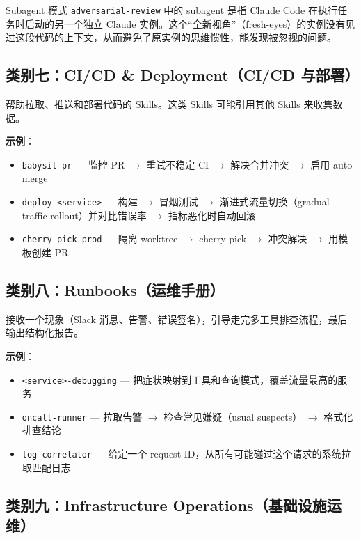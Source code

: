 \begin{knowledgebox}{Subagent 模式}
\texttt{adversarial-review} 中的 subagent 是指 Claude Code 在执行任务时启动的另一个独立 Claude 实例。这个``全新视角''（fresh-eyes）的实例没有见过这段代码的上下文，从而避免了原实例的思维惯性，能发现被忽视的问题。
\end{knowledgebox}

\subsection{类别七：CI/CD \& Deployment（CI/CD 与部署）}

帮助拉取、推送和部署代码的 Skills。这类 Skills 可能引用其他 Skills 来收集数据。

\textbf{示例}：
\begin{itemize}
    \item \texttt{babysit-pr} --- 监控 PR $\to$ 重试不稳定 CI $\to$ 解决合并冲突 $\to$ 启用 auto-merge
    \item \texttt{deploy-<service>} --- 构建 $\to$ 冒烟测试 $\to$ 渐进式流量切换（gradual traffic rollout）并对比错误率 $\to$ 指标恶化时自动回滚
    \item \texttt{cherry-pick-prod} --- 隔离 worktree $\to$ cherry-pick $\to$ 冲突解决 $\to$ 用模板创建 PR
\end{itemize}

\subsection{类别八：Runbooks（运维手册）}

接收一个现象（Slack 消息、告警、错误签名），引导走完多工具排查流程，最后输出结构化报告。

\textbf{示例}：
\begin{itemize}
    \item \texttt{<service>-debugging} --- 把症状映射到工具和查询模式，覆盖流量最高的服务
    \item \texttt{oncall-runner} --- 拉取告警 $\to$ 检查常见嫌疑（usual suspects） $\to$ 格式化排查结论
    \item \texttt{log-correlator} --- 给定一个 request ID，从所有可能碰过这个请求的系统拉取匹配日志
\end{itemize}

\subsection{类别九：Infrastructure Operations（基础设施运维）}

